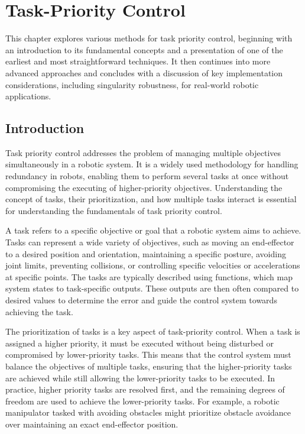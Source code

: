 \chapter{Task-Priority Control}
\label{ch:tpc}
\label{chap:tpc}

This chapter explores various methods for task priority control, beginning with
an introduction to its fundamental concepts and a presentation of one of the
earliest and most straightforward techniques. It then continues into more advanced
approaches and concludes with a discussion of key implementation considerations,
including singularity robustness, for real-world robotic applications.

\section{Introduction}
\label{sec:tpc_intro}

Task priority control addresses the problem of managing multiple objectives simultaneously in a robotic system. It is a widely used methodology for handling redundancy in robots, enabling them to perform several tasks at once without compromising the executing of higher-priority objectives. Understanding the concept of tasks, their prioritization, and how multiple tasks interact is essential for understanding the fundamentals of task priority control.

A task refers to a specific objective or goal that a robotic system aims to achieve. Tasks can represent a wide variety of objectives, such as moving an end-effector to a desired position and orientation, maintaining a specific posture, avoiding joint limits, preventing collisions, or controlling specific velocities or accelerations at specific points. The tasks are typically described using functions, which map system states to task-specific outputs. These outputs are then often compared to desired values to determine the error and guide the control system towards achieving the task.

The prioritization of tasks is a key aspect of task-priority control. When a task is assigned a higher priority, it must be executed without being disturbed or compromised by lower-priority tasks. This means that the control system must balance the objectives of multiple tasks, ensuring that the higher-priority tasks are achieved while still allowing the lower-priority tasks to be executed. In practice, higher priority tasks are resolved first, and the remaining degrees of freedom are used to achieve the lower-priority tasks. For example, a robotic manipulator tasked with avoiding obstacles might prioritize obstacle avoidance over maintaining an exact end-effector position.

